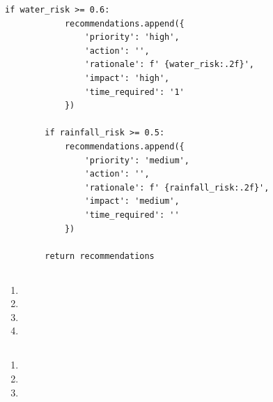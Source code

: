 \begin{lstlisting}[style=python]
        if water_risk >= 0.6:
            recommendations.append({
                'priority': 'high',
                'action': '',
                'rationale': f' {water_risk:.2f}',
                'impact': 'high',
                'time_required': '1'
            })
        
        if rainfall_risk >= 0.5:
            recommendations.append({
                'priority': 'medium',
                'action': '',
                'rationale': f' {rainfall_risk:.2f}',
                'impact': 'medium',
                'time_required': ''
            })
        
        return recommendations
\end{lstlisting}

\hypertarget{section-111}{%
\subsection{}\label{section-111}}

\important{}

\begin{enumerate}
\def\labelenumi{\arabic{enumi}.}
\item
  \important{}
\item
  \important{}
\item
  \important{}
\item
  \important{}
\end{enumerate}

\hypertarget{section-112}{%
\subsection{}\label{section-112}}

\hypertarget{section-113}{%
\subsubsection{}\label{section-113}}

\begin{enumerate}
\def\labelenumi{\arabic{enumi}.}
\tightlist
\item
\item
\item
\end{enumerate}

\hypertarget{section-114}{%
\subsubsection{}\label{section-114}}

